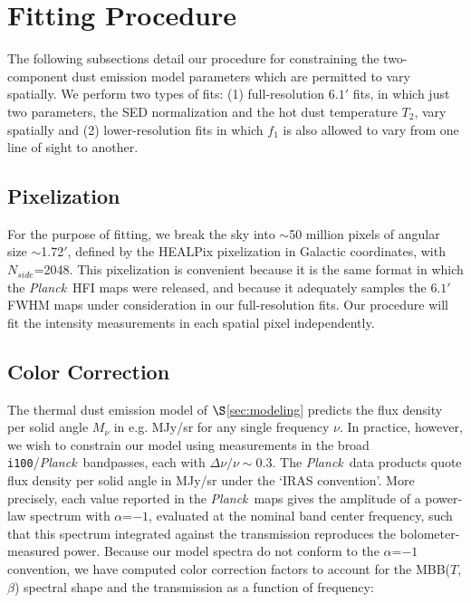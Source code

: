 \documentclass{emulateapj}
\newcommand{\PLANCK}{{\it Planck}}
\begin{document}
\section{Fitting Procedure}
\label{sec:fitting}

The following subsections detail our procedure for constraining the 
two-component dust emission model parameters which are permitted to vary
spatially. We perform two types of fits: (1) full-resolution 
$6.1'$ fits, in which just two parameters, the SED normalization and the hot 
dust temperature $T_2$, vary spatially and (2) lower-resolution fits in which 
$f_1$ is also allowed to vary from one line of sight to another.

\subsection{Pixelization}
\label{sec:pix}
For the purpose of fitting, we break the sky into $\sim$50 million pixels of 
angular size $\sim$1.72$'$, defined by the HEALPix pixelization in Galactic 
coordinates, with $N_{side}$=2048. This pixelization is convenient because it 
is the same format in which the \PLANCK~HFI maps were released, and because it 
adequately samples the $6.1'$ FWHM maps under consideration in our 
full-resolution fits. Our procedure will fit the intensity measurements in each
spatial pixel independently.

\subsection{Color Correction}
\label{sec:bpcorr}
The thermal dust emission model of $\S$\ref{sec:modeling} predicts the 
flux density per solid angle $M_{\nu}$ in e.g. MJy/sr for any single frequency 
$\nu$. In practice, however, we wish to constrain our model using measurements 
in the broad \verb|i100|/\PLANCK~bandpasses, each with $\Delta\nu/\nu\sim0.3$. 
The \PLANCK~data products quote flux density per solid angle in MJy/sr under 
the `IRAS convention'. More precisely, each value reported in the \PLANCK~maps 
gives the amplitude of a power-law spectrum with $\alpha$=$-1$, evaluated at 
the nominal band center frequency, such that this spectrum integrated against 
the transmission reproduces the bolometer-measured power. Because our model 
spectra do not conform to the $\alpha$=$-1$ convention, we have computed color 
correction factors to account for the MBB($T$, $\beta$) spectral shape and the 
transmission as a function of frequency:
\end{document}
